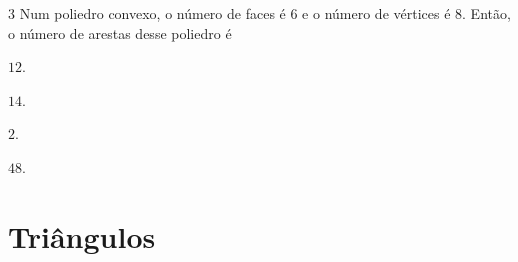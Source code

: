 \num{3}  Num poliedro convexo, o número de faces é $6$ e o número de vértices é
$8$. Então, o número de arestas desse poliedro é

\begin{escolha}
\item $12$.

\item $14$.

\item $2$.

\item $48$.
\end{escolha}



\chapter{Triângulos}

\vspace*{-.5cm}
\enlargethispage{\baselineskip}

